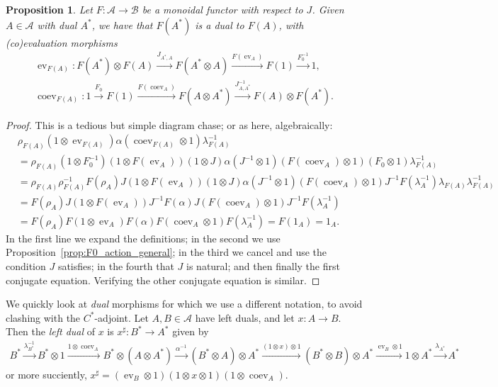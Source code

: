 \documentclass[a4paper,11pt]{article}
\theoremstyle{plain}
\newtheorem{proposition}{Proposition}[section]
\theoremstyle{remark}
\newcommand{\mc}[1]{\mathcal{#1}}
\newcommand{\ev}{\operatorname{ev}}
\newcommand{\coev}{\operatorname{coev}}
\begin{document}
\begin{proposition}\label{prop:func_preserves_dual}
Let $F \colon \mc A\to\mc B$ be a monoidal functor with respect to $J$.  Given $A\in\mc A$ with dual $A^*$, we have that $F(A^*)$ is a dual to $F(A)$, with (co)evaluation morphisms
\begin{gather*}
\ev_{F(A)} : F(A^*) \otimes F(A) \xrightarrow{J_{A^*,A}} F(A^*\otimes A) \xrightarrow{F(\ev_A)} F(1) \xrightarrow{F_0^{-1}} 1, \\
\coev_{F(A)} : 1 \xrightarrow{F_0} F(1) \xrightarrow{F(\coev_A)} F(A\otimes A^*) \xrightarrow{J_{A,A^*}^{-1}} F(A) \otimes F(A^*).
\end{gather*}
\end{proposition}
\begin{proof}
This is a tedious but simple diagram chase; or as here, algebraically:
\begin{align*}
& \rho_{F(A)}(1\otimes\ev_{F(A)})\alpha(\coev_{F(A)}\otimes 1)\lambda^{-1}_{F(A)} \\
&= \rho_{F(A)} (1\otimes F_0^{-1})(1\otimes F(\ev_A))(1\otimes J) \alpha (J^{-1}\otimes 1)(F(\coev_A)\otimes 1)(F_0\otimes 1) \lambda^{-1}_{F(A)} \\
&= \rho_{F(A)} \rho_{F(A)}^{-1} F(\rho_A) J (1\otimes F(\ev_A))(1\otimes J) \alpha (J^{-1}\otimes 1)(F(\coev_A)\otimes 1)J^{-1}F(\lambda_A^{-1})\lambda_{F(A)} \lambda^{-1}_{F(A)} \\
&= F(\rho_A) J (1\otimes F(\ev_A)) J^{-1} F(\alpha) J (F(\coev_A)\otimes 1)J^{-1}F(\lambda_A^{-1}) \\
&= F(\rho_A) F(1\otimes \ev_A) F(\alpha) F(\coev_A\otimes 1) F(\lambda_A^{-1}) = F(1_A) = 1_A.
\end{align*}
In the first line we expand the definitions; in the second we use Proposition~\ref{prop:F0_action_general}; in the third we cancel and use the condition $J$ satisfies; in the fourth that $J$ is natural; and then finally the first conjugate equation.  Verifying the other conjugate equation is similar.
\end{proof}

We quickly look at \emph{dual} morphisms for which we use a different notation, to avoid clashing with the $C^*$-adjoint.  Let $A,B\in\mc A$ have left duals, and let $x\colon A\to B$.  Then the \emph{left dual} of $x$ is $x^\sharp \colon B^* \to A^*$ given by
\begin{align*}
B^* \xrightarrow{\lambda^{-1}_{B^*}}
B^*\otimes 1 \xrightarrow{1\otimes\coev_A}
B^*\otimes(A\otimes A^*) \xrightarrow{\alpha^{-1}}
(B^*\otimes A)\otimes A^* \xrightarrow{(1\otimes x)\otimes 1}
(B^*\otimes B)\otimes A^* \xrightarrow{\ev_B\otimes 1}
1\otimes A^* \xrightarrow{\lambda_{A^*}}
A^*
\end{align*}
or more succiently, $x^\sharp = (\ev_B\otimes 1)(1\otimes x\otimes 1)(1\otimes\coev_A)$.
\end{document}
